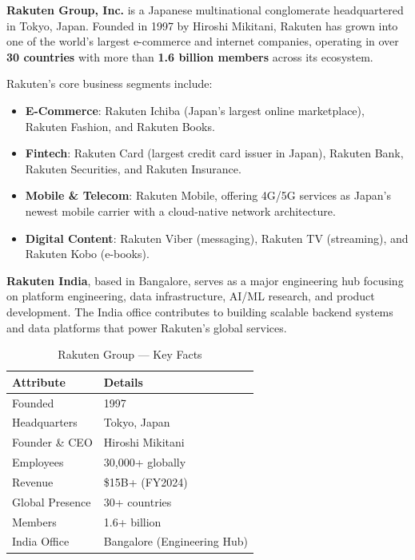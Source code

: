 \documentclass[12pt, a4paper]{article}
\begin{document}
\noindent \textbf{Rakuten Group, Inc.} is a Japanese multinational conglomerate headquartered in Tokyo, Japan. Founded in 1997 by Hiroshi Mikitani, Rakuten has grown into one of the world's largest e-commerce and internet companies, operating in over \textbf{30 countries} with more than \textbf{1.6 billion members} across its ecosystem.

\noindent Rakuten's core business segments include:

\begin{itemize}
    \item \textbf{E-Commerce}: Rakuten Ichiba (Japan's largest online marketplace), Rakuten Fashion, and Rakuten Books.
    \item \textbf{Fintech}: Rakuten Card (largest credit card issuer in Japan), Rakuten Bank, Rakuten Securities, and Rakuten Insurance.
    \item \textbf{Mobile \& Telecom}: Rakuten Mobile, offering 4G/5G services as Japan's newest mobile carrier with a cloud-native network architecture.
    \item \textbf{Digital Content}: Rakuten Viber (messaging), Rakuten TV (streaming), and Rakuten Kobo (e-books).
\end{itemize}

\noindent \textbf{Rakuten India}, based in Bangalore, serves as a major engineering hub focusing on platform engineering, data infrastructure, AI/ML research, and product development. The India office contributes to building scalable backend systems and data platforms that power Rakuten's global services.

\begin{table}[h!]
    \centering
    \caption{Rakuten Group --- Key Facts}
    \begin{tabular}{ll}
        \toprule
        \textbf{Attribute} & \textbf{Details} \\
        \midrule
        Founded         & 1997 \\
        Headquarters    & Tokyo, Japan \\
        Founder \& CEO  & Hiroshi Mikitani \\
        Employees       & 30,000+ globally \\
        Revenue         & \$15B+ (FY2024) \\
        Global Presence & 30+ countries \\
        Members         & 1.6+ billion \\
        India Office    & Bangalore (Engineering Hub) \\
        \bottomrule
    \end{tabular}
    \label{table:rakuten_facts}
\end{table}
\end{document}
